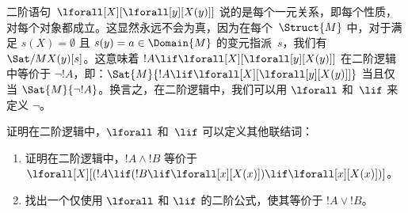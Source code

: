 \documentclass[../../../include/open-logic-section]{subfiles}
\begin{document}
\begin{ex}
  二阶语句~$\lforall[X][\lforall[y][X(y)]]$ 说的是每个一元关系，即每个性质，对每个对象都成立。这显然永远不会为真，因为在每个~$\Struct{M}$ 中，对于满足 $s(X) = \emptyset$ 且 $s(y) = a \in
  \Domain{M}$ 的变元指派~$s$，我们有 $\Sat/{M}{X(y)}[s]$。这意味着 $!A \lif
  \lforall[X][\lforall[y][X(y)]]$ 在二阶逻辑中等价于 $\lnot !A$，即：$\Sat{M}{!A \lif
  \lforall[X][\lforall[y][X(y)]]}$ 当且仅当 $\Sat{M}{\lnot !A}$。换言之，在二阶逻辑中，我们可以用 $\lforall$ 和~$\lif$ 来定义 $\lnot$。
\end{ex}

\begin{prob}
  证明在二阶逻辑中，$\lforall$ 和~$\lif$ 可以定义其他联结词：
  \begin{enumerate}
    \item 证明在二阶逻辑中，$!A \land !B$ 等价于 $\lforall[X][(!A \lif (!B \lif \lforall[x][X(x)])\lif
    \lforall[x][X(x)])]$。
    \item 找出一个仅使用 $\lforall$ 和 $\lif$ 的二阶公式，使其等价于 $!A \lor !B$。
  \end{enumerate}
\end{prob}
\end{document}
